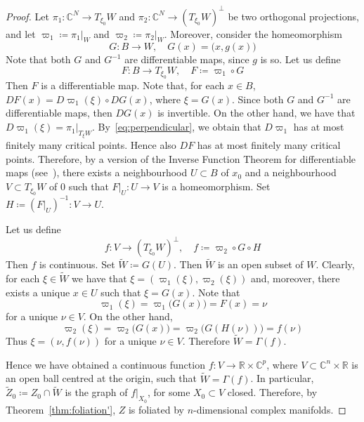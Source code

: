 \documentclass[reqno,oneside]{amsart}
\newcommand{\numberset}{\mathbb}
\newcommand{\R}{\numberset{R}}
\newcommand{\C}{\numberset{C}}
\theoremstyle{definition}
\theoremstyle{plain}
\theoremstyle{remark}
\begin{document}
\begin{proof}
	Let $\pi_1:\C^N\to T_{\xi_0}W$ and $\pi_2:\C^N\to (T_{\xi_0}W)^\perp$ be two orthogonal projections, and let $\varpi_1\coloneqq\pi_1|_W$ and $\varpi_2\coloneqq\pi_2|_W$. Moreover, consider the homeomorphism
	\[
		G:B\to W, \quad G(x)=\bigl(x,g(x)\bigr)
	\]
	Note that both $G$ and $G^{-1}$ are differentiable maps, since $g$ is so. Let us define
	\[
		F:B\to T_{\xi_0}W, \quad F\coloneqq\varpi_1\circ G
	\]
	Then $F$ is a differentiable map. Note that, for each $x\in B$, $DF(x)=D\varpi_1(\xi)\circ DG(x)$, where $\xi=G(x)$. Since both $G$ and $G^{-1}$ are differentiable maps, then $DG(x)$ is invertible. On the other hand, we have that $D\varpi_1(\xi)=\pi_1|_{T_\xi W}$. By~\eqref{eq:perpendicular}, we obtain that $D\varpi_1$ has at most finitely many critical points. Hence also $DF$ has at most finitely many critical points. Therefore, by a version of the Inverse Function Theorem for differentiable maps (see~\cite[Theorem~1.3]{li:implicit}), there exists a neighbourhood $U\subset B$ of $x_0$ and a neighbourhood $V\subset T_{\xi_0}W$ of $0$ such that $F|_U:U\to V$ is a homeomorphism. Set $H\coloneqq(F|_U)^{-1}:V\to U$.
	
	Let us define
	\[
		f:V\to(T_{\xi_0}W)^\perp, \quad f\coloneqq\varpi_2\circ G\circ H
	\]
	Then $f$ is continuous. Set $\tilde{W}\coloneqq G(U)$. Then $\tilde{W}$ is an open subset of $W$. Clearly, for each $\xi\in\tilde{W}$ we have that $\xi=(\varpi_1(\xi),\varpi_2(\xi))$ and, moreover, there exists a unique $x\in U$ such that $\xi=G(x)$. Note that
	\[
		\varpi_1(\xi)=\varpi_1\bigl(G(x)\bigr)=F(x)=\nu
	\]
	for a unique $\nu\in V$. On the other hand,
	\[
		\varpi_2(\xi)=\varpi_2\bigl(G(x)\bigr)=\varpi_2\bigl(G(H(\nu))\bigr)=f(\nu)
	\]
	Thus $\xi=(\nu,f(\nu))$ for a unique $\nu\in V$. Therefore $\tilde{W}=\Gamma(f)$.
	
	Hence we have obtained a continuous function $f:V\to\R\times\C^p$, where $V\subset\C^n\times\R$ is an open ball centred at the origin, such that $\tilde{W}=\Gamma(f)$. In particular, $\tilde{Z}_0\coloneqq Z_0\cap\tilde{W}$ is the graph of $f|_{X_0}$, for some $X_0\subset V$ closed. Therefore, by Theorem~\ref{thm:foliation'}, $Z$ is foliated by $n$-dimensional complex manifolds.
\end{proof}
\end{document}
